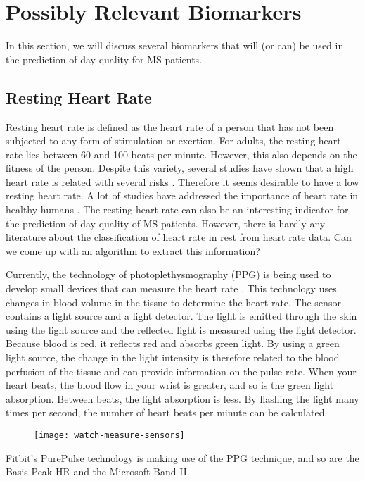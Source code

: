 \section{Possibly Relevant Biomarkers} \label{section:relevant biomarkers}
In this section, we will discuss several biomarkers that will (or can) be used in the prediction of day quality for MS patients.

\subsection{Resting Heart Rate} \label{section:Resting Heart Rate}
Resting heart rate is defined as the heart rate of a person that has not been subjected to any form of stimulation or exertion.
For adults, the resting heart rate lies between 60 and 100 beats per minute.
However, this also depends on the fitness of the person.
Despite this variety, several studies have shown that a high heart rate is related with several risks \cite{cunha1997association}.
Therefore it seems desirable to have a low resting heart rate.
A lot of studies have addressed the importance of heart rate in healthy humans \cite{reunanen2000heart, benetos1999influence, fujiura2001heart}.
The resting heart rate can also be an interesting indicator for the prediction of day quality of MS patients.
However, there is hardly any literature about the classification of heart rate in rest from heart rate data.
Can we come up with an algorithm to extract this information?

Currently, the technology of photoplethysmography (PPG) is being used to develop small devices that can measure the heart rate \cite{tamura2014wearable}. 
This technology uses changes in blood volume in the tissue to determine the heart rate. 
The sensor contains a light source and a light detector.
The light is emitted through the skin using the light source and the reflected light is measured using the light detector. 
Because blood is red, it reflects red and absorbs green light. 
By using a green light source, the change in the light intensity is therefore related to the blood perfusion of the tissue and can provide information on the pulse rate.
When your heart beats, the blood flow in your wrist is greater, and so is the green light absorption. 
Between beats, the light absorption is less. 
By flashing the light many times per second, the number of heart beats per minute can be calculated.
%
\begin{figure}
	\centering
	\texttt{[image: watch-measure-sensors]}
\end{figure}
%
Fitbit's PurePulse technology is making use of the PPG technique, and so are the Basis Peak HR and the Microsoft Band II.

